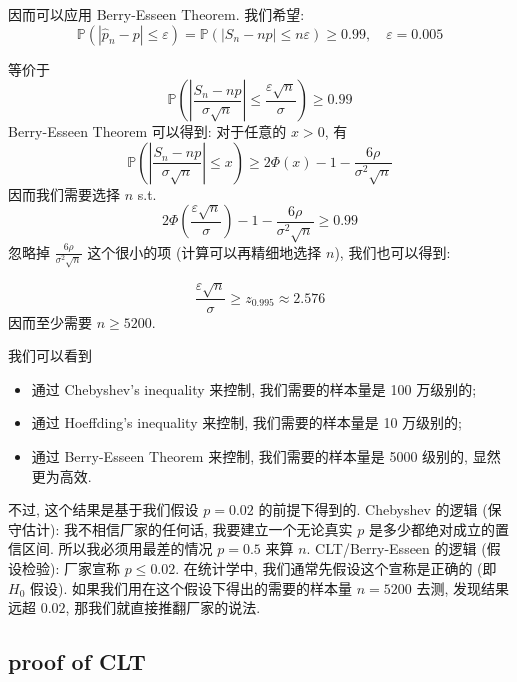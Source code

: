 \begin{example}
\begin{solution}
\begin{itemize}
因而可以应用 Berry-Esseen Theorem. 
我们希望:
$$ 
\mathbb{P}\left(\left|\hat{p}_n-p\right| \leq \varepsilon\right)=\mathbb{P}\left(\left|S_n-n p\right| \leq n \varepsilon\right) \geq 0.99, \quad \varepsilon=0.005 
$$

等价于
$$ \mathbb{P}\left(\left|\frac{S_n-n p}{\sigma \sqrt{n}}\right| \leq \frac{\varepsilon \sqrt{n}}{\sigma}\right) \geq 0.99
 $$
Berry-Esseen Theorem 可以得到:
对于任意的 $x > 0$,
有 
$$
\mathbb{P}\left(\left|\frac{S_n-n p}{\sigma \sqrt{n}}\right| \leq x\right) \geq 2 \Phi(x)-1-\frac{6 \rho}{\sigma^2 \sqrt{n}}
$$
因而我们需要选择 $n$ s.t. 
$$ 2 \Phi\left(\frac{\varepsilon \sqrt{n}}{\sigma}\right)-1-\frac{6 \rho}{\sigma^2 \sqrt{n}} \geq 0.99 
$$
忽略掉 $\frac{6 \rho}{\sigma^2 \sqrt{n}}$ 这个很小的项
(计算可以再精细地选择 $n$), 
我们也可以得到:

$$ \frac{\varepsilon \sqrt{n}}{\sigma} \geq z_{0.995} \approx 2.576 $$
因而至少需要 $n \geq 5200$. 
\end{itemize}
我们可以看到
\begin{itemize}
    \item 通过 Chebyshev's inequality 来控制, 我们需要的样本量是 100 万级别的; 
    \item 通过 Hoeffding's inequality 来控制, 我们需要的样本量是 10 万级别的; 
    \item 通过 Berry-Esseen Theorem 来控制, 我们需要的样本量是 5000 级别的, 显然更为高效. 
\end{itemize}
不过, 这个结果是基于我们假设 $p=0.02$ 
的前提下得到的.
Chebyshev 的逻辑 (保守估计): 我不相信厂家的任何话, 我要建立一个无论真实 $p$ 是多少都绝对成立的置信区间. 所以我必须用最差的情况 $p=0.5$ 来算 $n$.
CLT/Berry-Esseen 的逻辑 (假设检验):  
厂家宣称 $p \le 0.02$. 在统计学中, 
我们通常先假设这个宣称是正确的 (即 $H_0$ 假设).
如果我们用在这个假设下得出的需要的样本量
 $n=5200$ 去测, 发现结果远超 $0.02$, 那我们就直接推翻厂家的说法. 

\end{solution}
\end{example}




\subsection{proof of CLT}
